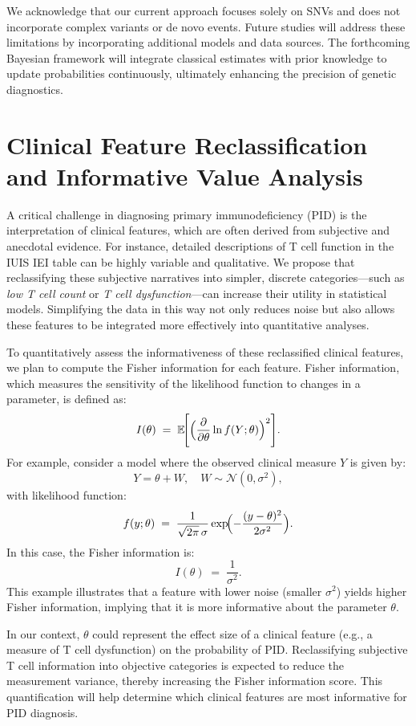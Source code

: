 We acknowledge that our current approach focuses solely on SNVs and does not incorporate complex variants or de novo events. Future studies will address these limitations by incorporating additional models and data sources. The forthcoming Bayesian framework will integrate classical estimates with prior knowledge to update probabilities continuously, ultimately enhancing the precision of genetic diagnostics.

\section{Clinical Feature Reclassification and Informative Value Analysis}

A critical challenge in diagnosing primary immunodeficiency (PID) is the interpretation of clinical features, which are often derived from subjective and anecdotal evidence. For instance, detailed descriptions of T cell function in the IUIS IEI table can be highly variable and qualitative. We propose that reclassifying these subjective narratives into simpler, discrete categories—such as \textit{low T cell count} or \textit{T cell dysfunction}—can increase their utility in statistical models. Simplifying the data in this way not only reduces noise but also allows these features to be integrated more effectively into quantitative analyses.

To quantitatively assess the informativeness of these reclassified clinical features, we plan to compute the Fisher information for each feature. Fisher information, which measures the sensitivity of the likelihood function to changes in a parameter, is defined as:
\[
I(\theta) \;=\; \mathbb{E}\!\Biggl[\Bigl(\frac{\partial}{\partial \theta}\ln f(Y;\theta)\Bigr)^{2}\Biggr].
\]
For example, consider a model where the observed clinical measure \(Y\) is given by:
\[
Y = \theta + W,\quad W \sim \mathcal{N}(0,\sigma^{2}),
\]
with likelihood function:
\[
f(y;\theta) \;=\; \frac{1}{\sqrt{2\pi}\,\sigma}\exp\!\Bigl(-\frac{(y-\theta)^{2}}{2\sigma^{2}}\Bigr).
\]
In this case, the Fisher information is:
\[
I(\theta) \;=\; \frac{1}{\sigma^{2}}.
\]
This example illustrates that a feature with lower noise (smaller \(\sigma^{2}\)) yields higher Fisher information, implying that it is more informative about the parameter \(\theta\).

In our context, \(\theta\) could represent the effect size of a clinical feature (e.g., a measure of T cell dysfunction) on the probability of PID. Reclassifying subjective T cell information into objective categories is expected to reduce the measurement variance, thereby increasing the Fisher information score. This quantification will help determine which clinical features are most informative for PID diagnosis.

